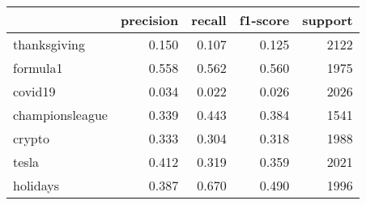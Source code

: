 \begin{tabular}{lrrrr}
\toprule
{} &  precision &  recall &  f1-score &  support \\
\midrule
thanksgiving    &      0.150 &   0.107 &     0.125 &     2122 \\
formula1        &      0.558 &   0.562 &     0.560 &     1975 \\
covid19         &      0.034 &   0.022 &     0.026 &     2026 \\
championsleague &      0.339 &   0.443 &     0.384 &     1541 \\
crypto          &      0.333 &   0.304 &     0.318 &     1988 \\
tesla           &      0.412 &   0.319 &     0.359 &     2021 \\
holidays        &      0.387 &   0.670 &     0.490 &     1996 \\
\bottomrule
\end{tabular}
